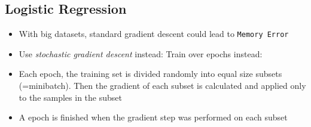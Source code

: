 \documentclass[english]{latex4ei/latex4ei_sheet}
\begin{document}
\begin{sectionbox}
 \subsection{Logistic Regression}
 \begin{itemize}
     \item  With big datasets, standard gradient descent could lead to       \texttt{Memory Error}
     \item Use \emph{stochastic gradient descent} instead: Train over epochs instead:
     \item Each epoch, the training set is divided randomly into equal size subsets (=minibatch). Then the gradient of each subset is calculated and applied only to the samples in the subset
     \item A epoch is finished when the gradient step was performed on each subset

 \end{itemize}
\end{sectionbox}
\end{document}
